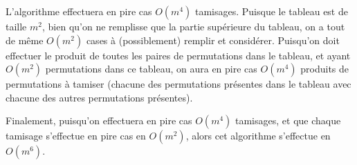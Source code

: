 \documentclass[11pt]{article} %
\begin{document}
L'algorithme effectuera en pire cas $O(m^4)$ tamisages. Puisque le tableau est de taille $m^2$, bien qu'on ne remplisse que la partie supérieure du tableau, on a tout de même $O(m^2)$ cases à (possiblement) remplir et considérer. Puisqu'on doit effectuer le produit de toutes les paires de permutations dans le tableau, et ayant $O(m^2)$ permutations dans ce tableau, on aura en pire cas $O(m^4)$ produits de permutations à tamiser (chacune des permutations présentes dans le tableau avec chacune des autres permutations présentes).

Finalement, puisqu'on effectuera en pire cas $O(m^4)$ tamisages, et que chaque tamisage s'effectue en pire cas en $O(m^2)$, alors cet algorithme s'effectue en $O(m^6)$.
\end{document}
